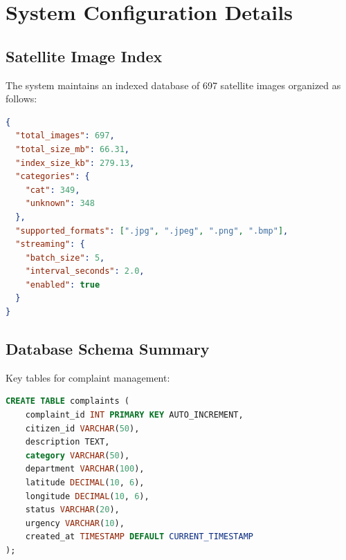 \documentclass[11pt,a4paper]{article}
\begin{document}
\appendix

\section{System Configuration Details}

\subsection{Satellite Image Index}

The system maintains an indexed database of 697 satellite images organized as follows:

\begin{lstlisting}[language=JSON]
{
  "total_images": 697,
  "total_size_mb": 66.31,
  "index_size_kb": 279.13,
  "categories": {
    "cat": 349,
    "unknown": 348
  },
  "supported_formats": [".jpg", ".jpeg", ".png", ".bmp"],
  "streaming": {
    "batch_size": 5,
    "interval_seconds": 2.0,
    "enabled": true
  }
}
\end{lstlisting}

\subsection{Database Schema Summary}

Key tables for complaint management:

\begin{lstlisting}[language=SQL]
CREATE TABLE complaints (
    complaint_id INT PRIMARY KEY AUTO_INCREMENT,
    citizen_id VARCHAR(50),
    description TEXT,
    category VARCHAR(50),
    department VARCHAR(100),
    latitude DECIMAL(10, 6),
    longitude DECIMAL(10, 6),
    status VARCHAR(20),
    urgency VARCHAR(10),
    created_at TIMESTAMP DEFAULT CURRENT_TIMESTAMP
);
\end{lstlisting}
\end{document}
